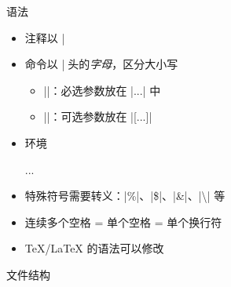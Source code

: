 \begin{frame}[fragile]{语法}
\begin{itemize}
  \item 注释以 |%
  \item 命令以 |\| 开头的\emph{字母}，区分大小写
    \begin{itemize}
      \item ||：必选参数放在 |{...}| 中
      \item ||：可选参数放在 |[...]|
    \end{itemize}

  \item 环境
    \begin{texcode}[gobble=4, emph={[1]envname}]
      \begin{envname}
        ...
      \end{envname}
    \end{texcode}

  \item 特殊符号需要转义：|\%|、|\$|、|\&|、|\textbackslash| 等
  \item 连续多个空格 = 单个空格 = 单个换行符 \pause
  \item \TeX{}/\LaTeX{} 的语法可以修改
\end{itemize}
\end{frame}


\begin{frame}[fragile]{文件结构}
\end{frame}


